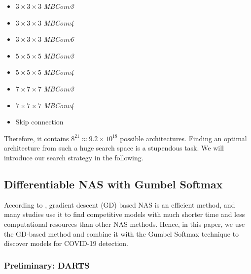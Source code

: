 \documentclass[letterpaper]{article}
\begin{document}
\begin{multicols}{2}
\begin{itemize}
    \item $3\times3\times3$ \textit{MBConv3}
    \item $3\times3\times3$ \textit{MBConv4}
    \item $3\times3\times3$ \textit{MBConv6}
    \item $5\times5\times5$ \textit{MBConv3}
    \item $5\times5\times5$ \textit{MBConv4}
    \item $7\times7\times7$ \textit{MBConv3}
    \item $7\times7\times7$ \textit{MBConv4}
    \item Skip connection
\end{itemize}
\end{multicols}

Therefore, it contains $8^{21}\approx 9.2\times10^{18}$ possible architectures. Finding an optimal architecture from such a huge search space is a stupendous task. We will introduce our search strategy in the following.

\subsection{Differentiable NAS with Gumbel Softmax}


According to \cite{automl_survey}, gradient descent (GD) based NAS is an efficient method, and many studies use it to find competitive models with much shorter time and less computational resources \cite{gdas,fbnet} than other NAS methods. Hence, in this paper, we use the GD-based method and combine it with the Gumbel Softmax \cite{Gumbel_Softmax} technique to discover models for COVID-19 detection.

\subsubsection{Preliminary: DARTS}
\end{document}
